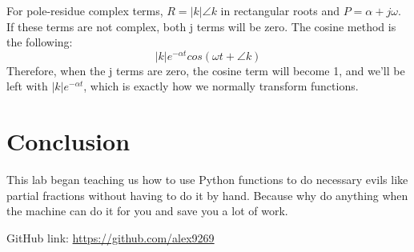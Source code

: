 \documentclass[12pt]{report}
\begin{document}
 For pole-residue complex terms, $R=|k|\angle{k}$ in rectangular roots and $P=\alpha+j\omega$. If these terms are not complex, both j terms will be zero. The cosine method is the following: $$|k|e^{-\alpha t}cos(\omega t+\angle{k})$$
 Therefore, when the j terms are zero, the cosine term will become 1, and we'll be left with $|k|e^{-\alpha t}$, which is exactly how we normally transform functions.
 
 \section{Conclusion}
 
 This lab began teaching us how to use Python functions to do necessary evils like partial fractions without having to do it by hand. Because why do anything when the machine can do it for you and save you a lot of work. 
 
 GitHub link: \url{https://github.com/alex9269}
 
\end{document}
